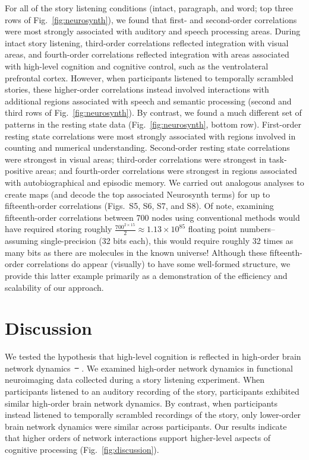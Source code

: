 \documentclass[english]{article}
\newcommand{\intact}{S5}
\newcommand{\para}{S6}
\newcommand{\word}{S7}
\newcommand{\rest}{S8}
\providecommand{\DIFaddtex}[1]{{\protect\color{blue}\uwave{#1}}} %
\providecommand{\DIFdeltex}[1]{{\protect\color{red}\sout{#1}}}                      %
\providecommand{\DIFaddbegin}{} %
\providecommand{\DIFaddend}{} %
\providecommand{\DIFdelbegin}{} %
\providecommand{\DIFdelend}{} %
\providecommand{\DIFadd}[1]{\texorpdfstring{\DIFaddtex{#1}}{#1}} %
\providecommand{\DIFdel}[1]{\texorpdfstring{\DIFdeltex{#1}}{}} %
\newcommand{\DIFscaledelfig}{0.5}
\newlength{\DIFdelgraphicswidth} %
\newlength{\DIFdelgraphicsheight} %
\newcommand{\DIFaddincludegraphics}[2][]{{\color{blue}\fbox{\DIFOincludegraphics[#1]{#2}}}} %
\newcommand{\DIFdelincludegraphics}[2][]{%
\sbox{\DIFdelgraphicsbox}{\DIFOincludegraphics[#1]{#2}}%
\settoboxwidth{\DIFdelgraphicswidth}{\DIFdelgraphicsbox} %
\settoboxtotalheight{\DIFdelgraphicsheight}{\DIFdelgraphicsbox} %
\scalebox{\DIFscaledelfig}{%
\parbox[b]{\DIFdelgraphicswidth}{\usebox{\DIFdelgraphicsbox}\\[-\baselineskip] \rule{\DIFdelgraphicswidth}{0em}}\llap{\resizebox{\DIFdelgraphicswidth}{\DIFdelgraphicsheight}{%
\setlength{\unitlength}{\DIFdelgraphicswidth}%
\begin{picture}(1,1)%
\thicklines\linethickness{2pt} %
{\color[rgb]{1,0,0}\put(0,0){\framebox(1,1){}}}%
{\color[rgb]{1,0,0}\put(0,0){\line( 1,1){1}}}%
{\color[rgb]{1,0,0}\put(0,1){\line(1,-1){1}}}%
\end{picture}%
}\hspace*{3pt}}} %
} %
\DeclareRobustCommand{\DIFaddbegin}{\DIFOaddbegin \let\includegraphics\DIFaddincludegraphics} %
\DeclareRobustCommand{\DIFaddend}{\DIFOaddend \let\includegraphics\DIFOincludegraphics} %
\DeclareRobustCommand{\DIFdelbegin}{\DIFOdelbegin \let\includegraphics\DIFdelincludegraphics} %
\DeclareRobustCommand{\DIFdelend}{\DIFOaddend \let\includegraphics\DIFOincludegraphics} %
\begin{document}
For all of the story listening conditions (intact, paragraph, and
word; top three rows of Fig.~\ref{fig:neurosynth}), we found that
first- and second-order correlations were most strongly associated
with auditory and speech processing areas.  During intact story
listening, third-order correlations reflected integration with visual
areas, and fourth-order correlations reflected integration with areas
associated with high-level cognition and cognitive control, such as
the ventrolateral prefrontal cortex.  However, when participants
listened to temporally scrambled stories, these higher-order
correlations instead involved interactions with additional regions
associated with speech and semantic processing (second and third rows
of Fig.~\ref{fig:neurosynth}).  By contrast, we found
a much different set of patterns in the resting state data
(Fig.~\ref{fig:neurosynth}, bottom row).
First-order resting state correlations were most strongly associated
with regions involved in counting and numerical understanding.
Second-order resting state correlations were strongest in visual
areas; third-order correlations were strongest in task-positive areas;
and fourth-order correlations were strongest in regions associated
with autobiographical and episodic memory.  We carried out analogous
analyses to create maps (and decode the top associated Neurosynth
terms) for up to fifteenth-order correlations (Figs.~\intact, \para,
\word, and \rest).  Of note, examining fifteenth-order correlations
between 700 nodes using conventional methods would have required
storing roughly
$\frac{700^{2 \times 15}}{2} \approx 1.13 \times 10^{85}$ floating
point numbers-- assuming single-precision (32 bits each), this would
require roughly 32 times as many bits as there are molecules in the
known universe!  Although these fifteenth-order correlations do appear
(visually) to have some well-formed structure, we provide this latter
example primarily as a demonstration of the efficiency and scalability
of our approach.






\section*{Discussion}
We tested the hypothesis that high-level cognition is reflected in
high-order brain network dynamics~\DIFdelbegin \DIFdel{\mbox{%
\citep[e.g., see][]{SoloEtal19,
  ReimEtal17}}\hspace{0pt}%
}\DIFdelend \DIFaddbegin \DIFadd{\mbox{%
\cite{SoloEtal19,
  ReimEtal17}}\hspace{0pt}%
}\DIFaddend .  We examined high-order network dynamics in functional
neuroimaging data collected during a story listening experiment.  When
participants listened to an auditory recording of the story,
participants exhibited similar high-order brain network dynamics.  By
contrast, when participants instead listened to temporally scrambled
recordings of the story, only lower-order brain network dynamics were
similar across participants.  Our results indicate that higher orders
of network interactions support higher-level aspects of cognitive
processing (Fig.~\ref{fig:discussion}).
\end{document}
